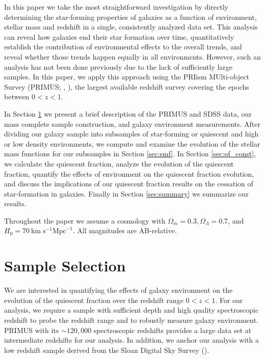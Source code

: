 \documentclass{emulateapj}
\begin{document}

In this paper we take the most straightforward investigation
by directly determining the star-forming properties of galaxies
as a function of environment, stellar mass and redshift in a single,
consistently analyzed data set. This analysis can reveal how galaxies
end their star formation over time, quantitatively establish the
contribution of environmental effects to the overall trends, and
reveal whether those trends happen equally in all environments.
However, such an analysis has not been done previously due to the lack
of sufficiently large samples. In this paper, we apply this approach
using the PRIism MUlti-object Survey (PRIMUS; \citealt{Coil:2011aa},
\citealt{Cool:2013aa}), the largest available redshift survey covering
the epochs between $0<z<1$.

In Section \ref{sec:sample} we present a brief description of the
PRIMUS and SDSS data, our mass complete sample construction, and
galaxy environment measurements. After dividing our galaxy sample into
subsamples of star-forming or quiescent and high or low density
environments, we compute and examine the evolution of the stellar mass
functions for our subsamples in Section \ref{sec:smf}. In
Section \ref{sec:qf_const}, we calculate the quiescent fraction,
analyze the evolution of the quiescent fraction, quantify the effects
of environment on the quiescent fraction evolution, and discuss the
implications of our quiescent fraction results on the cessation of
star-formation in galaxies. Finally in Section \ref{sec:summary} we
summarize our results.

Throughout the paper we assume a cosmology with $\Omega_{m} = 0.3,
\Omega_{\Lambda} = 0.7$, and $H_0 = 70 \: \mathrm{km} \; \mathrm{s}^{-1}
\mathrm{Mpc}^{-1}$. All magnitudes are AB-relative. 

\section{Sample Selection} \label{sec:sample}
We are interested in quantifying the effects of galaxy environment on
the evolution of the quiescent fraction over the redshift range $0 < z < 1$. For our analysis, we require a sample with sufficient depth and high quality spectroscopic redshift to probe the redshift range and to robustly measure galaxy environment. PRIMUS with its $\sim 120,000$ spectroscopic redshifts provides a large data set at intermediate redshifts for our analysis. In addition, we anchor our analysis with a low redshift sample derived from the Sloan Digital Sky Survey (\citealt{York:2000aa}). 
\end{document}

